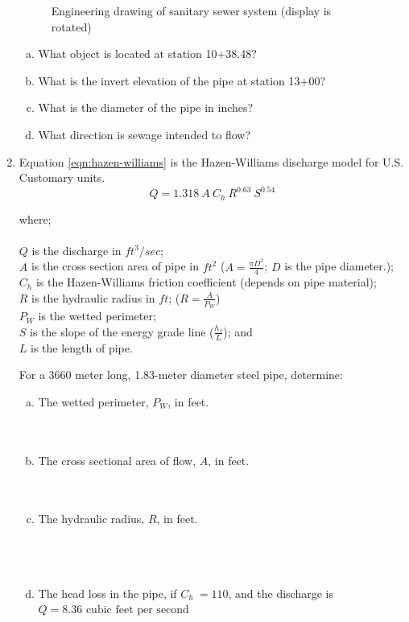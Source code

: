 \documentclass[11pt]{article}
\newcommand\tab[1][1cm]{\hspace*{#1}}
\begin{document}
\begin{enumerate}
\begin{figure}[h!]
   \caption{Engineering drawing of sanitary sewer system (display is rotated)}
   \label{fig:SewerDrawing}
\end{figure}

\begin{enumerate}[(a)]
\item What object is located at station 10+38.48?
\item What is the invert elevation of the pipe at station 13+00?
\item What is the diameter of the pipe in inches?
\item What direction is sewage intended to flow?
\end{enumerate}
\clearpage
\item Equation \ref{eqn:hazen-williams} is the  Hazen-Williams discharge model for U.S. Customary units.
\begin{equation}
Q = 1.318~A~C_h~R^{0.63}~S^{0.54}
\label{eqn:hazen-williams}
\end{equation}

where;\\~\\
\tab $Q$ is the discharge in $ft^3/sec$;\\
\tab $A$ is the cross section area of pipe in $ft^2$ ($A = \frac{\pi D^2}{4}$; $D$ is the pipe diameter.);\\
\tab $C_h$ is the Hazen-Williams friction coefficient (depends on pipe material);\\
\tab $R $ is the hydraulic radius in $ft$;  ($R=\frac{A}{P_W}$)\\
\tab $P_W$ is the wetted perimeter; \\
\tab $S$ is the slope of the energy grade line ($\frac{h_f}{L}$); and \\
\tab $L$ is the length of pipe.

For a 3660 meter long, 1.83-meter diameter steel pipe, determine:
\begin{enumerate}[(a)]
\item The wetted perimeter, $P_W$, in feet. \\~\\~\\
\item The cross sectional area of flow, $A$, in feet. \\~\\~\\
\item The hydraulic radius, $R$, in feet. \\~\\~\\~\\
\item The head loss in the pipe, if $C_h~=110$, and the discharge is $Q=8.36\text{~cubic feet per second}$


\end{enumerate}
\end{enumerate}
\end{document}
